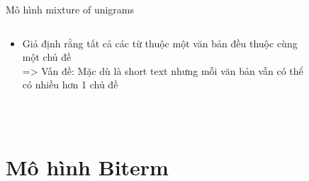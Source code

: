 \documentclass[pdf]{beamer}
\begin{document}
\begin{frame}{Mô hình mixture of unigrams}
\begin{columns}[T] %
	\begin{column}{.50\textwidth}
		\begin{itemize}
			\item Giả định rằng tất cả các từ thuộc một văn bản đều thuộc cùng một chủ đề\\
			=> Vấn đề: Mặc dù là short text nhưng mỗi văn bản vẫn có thể có nhiều hơn 1 chủ đề
		\end{itemize}
	\end{column} %
	\hfill%
	\begin{column}{.50\textwidth}
		\begin{figure}
		\end{figure}				
	\end{column} %
\end{columns}
$\hspace{5cm}$
\end{frame}


\section{Mô hình Biterm}
\end{document}
